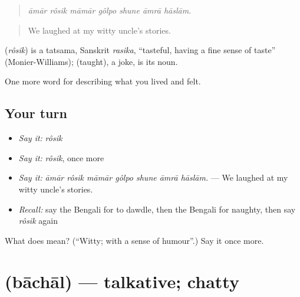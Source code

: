 \begin{quote}
      
\end{quote}

\begin{quote}
\emph{āmār rôsik māmār gôlpo shune āmrā hāslām.}
\end{quote}

\begin{quote}
We laughed at my witty uncle's stories.
\end{quote}

\begin{cousinweb}
\textbf{} (\emph{rôsik}) is a tatsama, Sanskrit \emph{rasika}, \textquotedblleft{}tasteful, having a fine sense of taste\textquotedblright{} (Monier-Williams);  (taught), a joke, is its noun.
\end{cousinweb}

\begin{grammarlens}[title={What you've built}]
One more word for describing what you lived and felt.
\end{grammarlens}

\subsection*{Your turn}
\begin{itemize}
\raggedright
  \item \emph{Say it:} \emph{rôsik}
  \item \emph{Say it:} \emph{rôsik}, once more
  \item \emph{Say it:} \emph{āmār rôsik māmār gôlpo shune āmrā hāslām.} — We laughed at my witty uncle's stories.
  \item \emph{Recall:} say the Bengali for to dawdle, then the Bengali for naughty, then say \emph{rôsik} again
\end{itemize}

\begin{tcolorbox}[breakable,colback=teal!4,colframe=teal!35!black,title={Before you move on}]
What does  mean? (\textquotedblleft{}Witty; with a sense of humour\textquotedblright{}.) Say it once more.
\end{tcolorbox}
\section[\texorpdfstring{\bn{বাচাল} (bāchāl)}{বাচাল (bāchāl)}]{ (bāchāl) — talkative; chatty}

